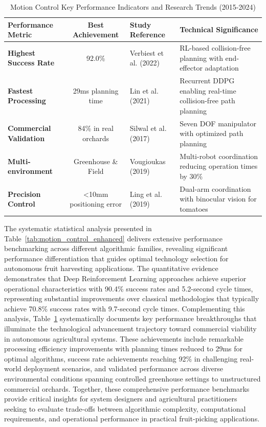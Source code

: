 \documentclass{ieeeaccess}
\begin{document}
\begin{table}[htbp]
\centering
\small
\renewcommand{\arraystretch}{1.2}
\caption{Motion Control Key Performance Indicators and Research Trends (2015-2024)}
\label{tab:motion_control_kpis}
\begin{tabularx}{\textwidth}{l c X X}
\toprule
\textbf{Performance Metric} & \textbf{Best Achievement} & \textbf{Study Reference} & \textbf{Technical Significance} \\
\midrule
\textbf{Highest Success Rate} & 92.0\% & Verbiest et al. (2022) & RL-based collision-free planning with end-effector adaptation \\
\midrule
\textbf{Fastest Processing} & 29ms planning time & Lin et al. (2021) & Recurrent DDPG enabling real-time collision-free path planning \\
\midrule
\textbf{Commercial Validation} & 84\% in real orchards & Silwal et al. (2017) & Seven DOF manipulator with optimized path planning \\
\midrule
\textbf{Multi-environment} & Greenhouse \& Field & Vougioukas (2019) & Multi-robot coordination reducing operation times by 30\% \\
\midrule
\textbf{Precision Control} & <10mm positioning error & Ling et al. (2019) & Dual-arm coordination with binocular vision for tomatoes \\
\bottomrule
\end{tabularx}
\end{table}
\fi
The systematic statistical analysis presented in Table~\ref{tab:motion_control_enhanced} delivers extensive performance benchmarking across different algorithmic families, revealing significant performance differentiation that guides optimal technology selection for autonomous fruit harvesting applications. The quantitative evidence demonstrates that Deep Reinforcement Learning approaches achieve superior operational characteristics with 90.4\% success rates and 5.2-second cycle times, representing substantial improvements over classical methodologies that typically achieve 70.8\% success rates with 9.7-second cycle times. Complementing this analysis, Table~\ref{tab:motion_control_kpis} systematically documents key performance breakthroughs that illuminate the technological advancement trajectory toward commercial viability in autonomous agricultural systems. These achievements include remarkable processing efficiency improvements with planning times reduced to 29ms for optimal algorithms, success rate achievements reaching 92\% in challenging real-world deployment scenarios, and validated performance across diverse environmental conditions spanning controlled greenhouse settings to unstructured commercial orchards. Together, these comprehensive performance benchmarks provide critical insights for system designers and agricultural practitioners seeking to evaluate trade-offs between algorithmic complexity, computational requirements, and operational performance in practical fruit-picking applications.
\end{document}
